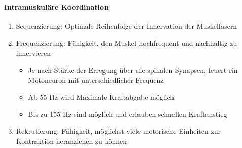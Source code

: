 \paragraph{Intramuskuläre Koordination}
\begin{enumerate}
    \item Sequenzierung: Optimale Reihenfolge der Innervation der Muskelfasern
    \item Frequenzierung: Fähigkeit, den Muskel hochfrequent und nachhaltig zu innervieren
    \begin{itemize}
        \item Je nach Stärke der Erregung über die spinalen Synapsen, feuert ein Motoneuron mit unterschiedlicher Frequenz
        \item  Ab 55 Hz wird Maximale Kraftabgabe möglich
        \item  Bis zu 155 Hz sind möglich und erlauben schnellen Kraftanstieg
    \end{itemize}
    \item Rekrutierung: Fähigkeit, möglichst viele motorische Einheiten zur Kontraktion heranziehen zu können
\end{enumerate}
